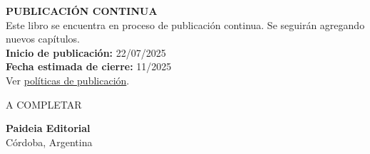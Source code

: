 {\begin{titlepage}
    \begin{tcolorbox}[
      colback=lightgreen,
      colframe=chaptercolor,
      boxrule=2pt,
      arc=8pt,
      left=15pt,
      right=15pt,
      top=10pt,
      bottom=10pt,
      width=0.85\textwidth
    ]
      \centering
      \textbf{\Large\color{chaptercolor}PUBLICACIÓN CONTINUA}\\[0.6em]
      \normalsize Este libro se encuentra en proceso de publicación continua. Se seguirán agregando nuevos capítulos.\\[0.8em]
      \small \textbf{Inicio de publicación:} 22/07/2025\\[0.3em]
      \small \textbf{Fecha estimada de cierre:} 11/2025\\[0.4em]
      \small Ver \href{https://paideiaeditorial.net/politicas\#title-policies-9}{políticas de publicación}.
    \end{tcolorbox}
    
    \vspace{0.3cm}
    
    {\large A COMPLETAR}\\[0.8cm]
    
    \vfill
    
    {\large\textbf{Paideia Editorial}}\\
    {\normalsize Córdoba, Argentina}
    
  \end{titlepage}
  \cleardoublepage
}